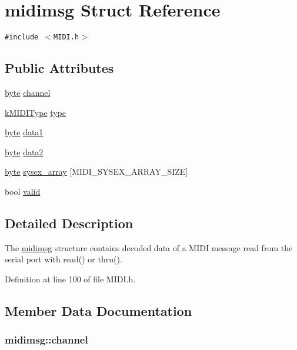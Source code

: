 \hypertarget{structmidimsg}{
\section{midimsg Struct Reference}
\label{structmidimsg}
}
{\tt \#include $<$MIDI.h$>$}

\subsection*{Public Attributes}
\begin{CompactItemize}
\item 
\hyperlink{_m_i_d_i_8h_b8ef12fab634c171394422d0ee8baf94}{byte} \hyperlink{structmidimsg_b0be990f365123787ec088f55ae6e46b}{channel}
\item 
\hyperlink{_m_i_d_i_8h_802feb46a169642d43b2415d02390545}{kMIDIType} \hyperlink{structmidimsg_c2aa51d6154e6434f4426f925c6e5287}{type}
\item 
\hyperlink{_m_i_d_i_8h_b8ef12fab634c171394422d0ee8baf94}{byte} \hyperlink{structmidimsg_d0a225fbc23de9f631331d6aa52ab981}{data1}
\item 
\hyperlink{_m_i_d_i_8h_b8ef12fab634c171394422d0ee8baf94}{byte} \hyperlink{structmidimsg_240be209353b132d10757bf345146e6b}{data2}
\item 
\hyperlink{_m_i_d_i_8h_b8ef12fab634c171394422d0ee8baf94}{byte} \hyperlink{structmidimsg_253df8383f977227e7d45ba488d98601}{sysex\_\-array} \mbox{[}MIDI\_\-SYSEX\_\-ARRAY\_\-SIZE\mbox{]}
\item 
bool \hyperlink{structmidimsg_dd91395b86cb7ace5ba8c1654ab61d2e}{valid}
\end{CompactItemize}


\subsection{Detailed Description}
The \hyperlink{structmidimsg}{midimsg} structure contains decoded data of a MIDI message read from the serial port with read() or thru(). \par
 

Definition at line 100 of file MIDI.h.

\subsection{Member Data Documentation}
\hypertarget{structmidimsg_b0be990f365123787ec088f55ae6e46b}{
\subsubsection[{channel}]{ {\bf midimsg::channel}}}
\label{structmidimsg_b0be990f365123787ec088f55ae6e46b}


